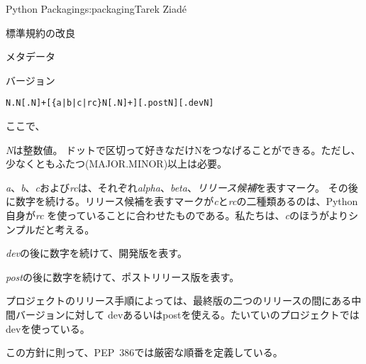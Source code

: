 \begin{aosachapter}{Python Packaging}{s:packaging}{Tarek Ziad\'{e}}
\begin{aosasect1}{標準規約の改良}
\begin{aosasect2}{メタデータ}
\begin{aosasect3}{バージョン}
\begin{verbatim}
N.N[.N]+[{a|b|c|rc}N[.N]+][.postN][.devN]
\end{verbatim}

\noindent
ここで、

\begin{aosaitemize}

  \item \emph{N}は整数値。
  ドットで区切って好きなだけNをつなげることができる。ただし、少なくともふたつ(MAJOR.MINOR)以上は必要。

  \item \emph{a}、\emph{b}、\emph{c}および\emph{rc}は、それぞれ\emph{alpha}、\emph{beta}、\emph{リリース候補}を表すマーク。
  その後に数字を続ける。リリース候補を表すマークが\emph{c}と\emph{rc}の二種類あるのは、Python自身が\emph{rc}
  を使っていることに合わせたものである。私たちは、\emph{c}のほうがよりシンプルだと考える。

  \item \emph{dev}の後に数字を続けて、開発版を表す。

  \item \emph{post}の後に数字を続けて、ポストリリース版を表す。

\end{aosaitemize}

\noindent
プロジェクトのリリース手順によっては、最終版の二つのリリースの間にある中間バージョンに対して
devあるいはpostを使える。たいていのプロジェクトではdevを使っている。

\pagebreak

この方針に則って、PEP~386では厳密な順番を定義している。


\end{aosasect3}
\end{aosasect2}
\end{aosasect1}
\end{aosachapter}
